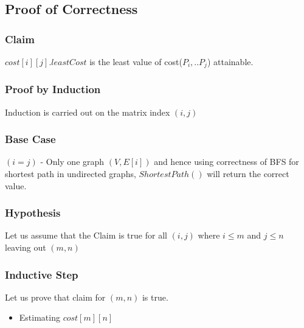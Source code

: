\documentclass{article}
\begin{document}
\subsection{Proof of Correctness}
\subsubsection{Claim}
$cost[i][j].leastCost$ is the least value of cost($P_i,..P_j$) attainable.  
\subsubsection{Proof by Induction}
Induction is carried out on the matrix index $(i,j)$
\subsubsection{Base Case}
$(i=j)$ - Only one graph $(V,E[i])$ and hence using correctness of BFS for shortest path in undirected graphs, $ShortestPath()$ will return the correct value.
\subsubsection{Hypothesis}
Let us assume that the Claim is true for all $(i,j)$ where $i \leq m$ and $j \leq n$ leaving out $(m,n)$
\subsubsection{Inductive Step}
Let us prove that claim for $(m,n)$ is true.
\begin{itemize}
\item Estimating $cost[m][n]$ 
\end{itemize}
\end{document}
